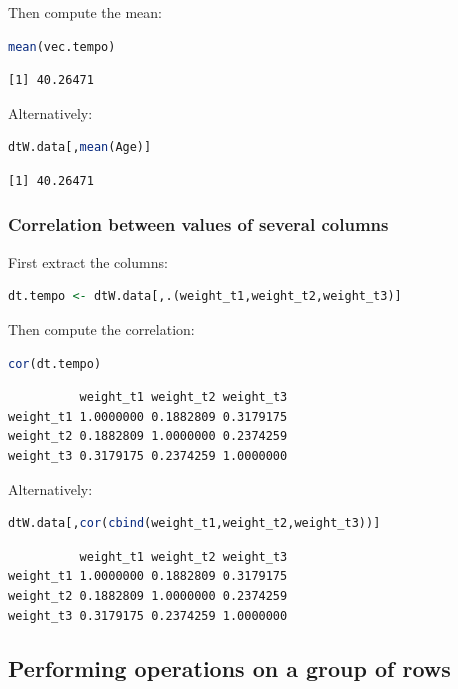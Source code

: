 \documentclass{article}
\begin{document}
Then compute the mean:
\begin{lstlisting}[language=r,numbers=none]
mean(vec.tempo)
\end{lstlisting}

\label{}
\begin{verbatim}
[1] 40.26471
\end{verbatim}


Alternatively:
\begin{lstlisting}[language=r,numbers=none]
dtW.data[,mean(Age)]
\end{lstlisting}

\label{}
\begin{verbatim}
[1] 40.26471
\end{verbatim}
\subsubsection{Correlation between values of several columns}
\label{sec:org9681646}

First extract the columns:
\begin{lstlisting}[language=r,numbers=none]
dt.tempo <- dtW.data[,.(weight_t1,weight_t2,weight_t3)]
\end{lstlisting}

Then compute the correlation:
\begin{lstlisting}[language=r,numbers=none]
cor(dt.tempo)
\end{lstlisting}

\label{}
\begin{verbatim}
          weight_t1 weight_t2 weight_t3
weight_t1 1.0000000 0.1882809 0.3179175
weight_t2 0.1882809 1.0000000 0.2374259
weight_t3 0.3179175 0.2374259 1.0000000
\end{verbatim}


Alternatively:
\begin{lstlisting}[language=r,numbers=none]
dtW.data[,cor(cbind(weight_t1,weight_t2,weight_t3))]
\end{lstlisting}

\label{}
\begin{verbatim}
          weight_t1 weight_t2 weight_t3
weight_t1 1.0000000 0.1882809 0.3179175
weight_t2 0.1882809 1.0000000 0.2374259
weight_t3 0.3179175 0.2374259 1.0000000
\end{verbatim}
\subsection{Performing operations on a group of rows}
\label{sec:orgbdbc678}
\end{document}
